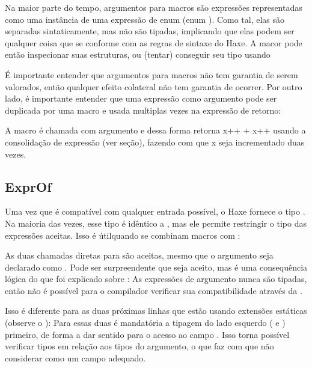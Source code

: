 Na maior parte do tempo, argumentos para macros são expressões representadas como uma instância de uma expressão de enum (enum ). Como tal, elas são separadas sintaticamente, mas não são tipadas, implicando que elas podem ser qualquer coisa que se conforme com as regras de sintaxe do Haxe. A macor pode então inspecionar suas estruturas, ou (tentar) conseguir seu tipo usando 

É importante entender que argumentos para macros não tem garantia de serem valorados, então qualquer efeito colateral não tem garantia de ocorrer. Por outro lado, é importante entender que uma expressão como argumento pode ser duplicada por uma macro e usada multiplas vezes na expressão de retorno:


A macro  é chamada com argumento  e dessa forma retorna x++ + x++ usando a consolidação de expressão (ver seção), fazendo com que x seja incrementado duas vezes.

\subsection{ExprOf}
\label{macro-ExprOf}

Uma vez que  é compatível com qualquer entrada possível, o Haxe fornece o tipo . Na maioria das vezes, esse tipo é idêntico a , mas ele permite restringir o tipo das expressões aceitas. Isso é útilquando se combinam macros com :


As duas chamadas diretas para  são aceitas, mesmo que o argumento seja declarado como . Pode ser surpreendente que   seja aceito, mas é uma consequência lógica do que foi explicado sobre : As expressões de argumento nunca são tipadas, então não é possível para o compilador verificar sua compatibilidade através da . 

Isso é diferente para as duas próximas linhas que estão usando extensões estáticas (observe o ): Para essas duas é mandatória a tipagem do lado esquerdo ( e ) primeiro, de forma a dar sentido para o acesso ao campo . Isso torna possível verificar tipos em relação aos tipos do argumento, o que faz com que  não considerar  como um campo adequado.

